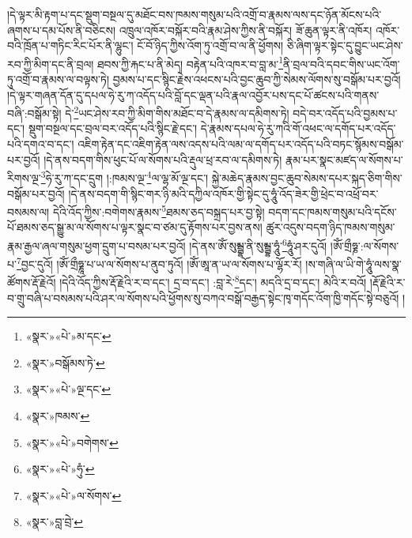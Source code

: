 །དེ་ལྟར་མི་རྟག་པ་དང་སྡུག་བསྔལ་དུ་མཐོང་བས་ཁམས་གསུམ་པའི་འགྲོ་བ་རྣམས་ལས་དང་ཉོན་མོངས་པའི་ཞགས་པ་དམ་པོས་ནི་བཅིངས། འཁྲུལ་འཁོར་བསྐོར་བའི་རྣམ་ཤེས་ཀྱིས་ནི་བསྐོར། ཟོ་ཆུན་ལྟར་ནི་འཁོར། འཁོར་བའི་ཁྲོན་པ་གཏིང་རིང་པོར་ནི་ལྷུང་། ངོ་བོ་ཉིད་ཀྱིས་འོག་ཏུ་འགྲོ་བ་ལ་ནི་ཕྱོགས། ཅི་ཞིག་ལྟར་སྟེང་དུ་བྱུང་ཡང་ཤེས་རབ་ཀྱི་མིག་དང་ནི་བྲལ། ཐབས་ཀྱི་རྐང་པ་ནི་མེད། བརྟེན་པའི་འཁར་བ་བླ་མ་\footnote{«སྣར་»«པེ་»མ་དང་}ནི་བྲལ་བའི་དབང་གིས་ཡང་འོག་ཏུ་འགྲོ་བ་རྣམས་ལ་བལྟས་ཏེ། བྱམས་པ་དང་སྙིང་རྗེས་འཕངས་པའི་བྱང་ཆུབ་ཀྱི་སེམས་ལོགས་སུ་བསྒོམ་པར་བྱའོ། །དེ་ལྟར་གཞན་དོན་དུ་དཔལ་ཧེ་རུ་ཀ་འདོད་པའི་བློ་དང་ལྡན་པའི་རྣལ་འབྱོར་པས་དང་པོ་ཚངས་པའི་གནས་བཞི་:བསྒོམ་སྟེ། དེ་\footnote{«སྣར་»བསྒོམས་ཏེ་}ཡང་ཤེས་རབ་ཀྱི་མིག་གིས་མཐོང་བ་དེ་རྣམས་ལ་དམིགས་ཏེ། བདེ་བར་འདོད་པའི་བྱམས་པ་དང་། སྡུག་བསྔལ་དང་བྲལ་བར་འདོད་པའི་སྙིང་རྗེ་དང་། དེ་རྣམས་དཔལ་ཧེ་རུ་ཀའི་གོ་འཕང་ལ་དགོད་པར་འདོད་པའི་དགའ་བ་དང་། འཇིག་རྟེན་དང་འཇིག་རྟེན་ལས་འདས་པའི་ལམ་ལ་དགོད་པར་འདོད་པའི་བཏང་སྙོམས་བསྒོམ་པར་བྱའོ། །དེ་ནས་བདག་གིས་ཕུང་པོ་ལ་སོགས་པའི་རྡུལ་ཕྲ་རབ་ལ་དམིགས་ཏེ། རྣམ་པར་སྣང་མཛད་ལ་སོགས་པ་རིགས་ལྔ་\footnote{«སྣར་»«པེ་»ལྔ་དང་}ཧེ་རུ་ཀ་དང་དྲུག །:ཁམས་ལྔ་\footnote{«སྣར་»ཁམས་}ལ་ལྷ་མོ་ལྔ་དང་། སྐྱེ་མཆེད་རྣམས་བྱང་ཆུབ་སེམས་དཔར་སྐད་ཅིག་གིས་བསྒོམ་པར་བྱའོ། །དེ་ནས་བདག་གི་སྙིང་གར་ཉི་མའི་དཀྱིལ་འཁོར་གྱི་སྟེང་དུ་ཧཱུཾ་འོད་ཟེར་གྱི་ཕྲེང་བ་འཕྲོ་བར་བསམས་ལ། དེའི་འོད་ཀྱིས་:བགེགས་རྣམས་\footnote{«སྣར་»«པེ་»བགེགས་}ཐམས་ཅད་བསྐྲད་པར་བྱ་སྟེ། བདག་དང་ཁམས་གསུམ་པའི་དངོས་པོ་ཐམས་ཅད་སྒྱུ་མ་ལ་སོགས་པ་ལྟར་སྣང་བ་ཙམ་དུ་རྟོགས་པར་བྱས་ནས། ཚུར་འདུས་བདག་ཉིད་ཁམས་གསུམ་རྣམ་རྒྱལ་ཞལ་གསུམ་ཕྱག་དྲུག་པ་བསམ་པར་བྱའོ། །དེ་ནས་ཨོཾ་སུམྦྷ་ནི་སུམྦྷ་ཧཱུཾ་\footnote{«སྣར་»«པེ་»ཧུཾ་}ཧཱུཾ་ཤར་དུའོ། །ཨོཾ་གྲྀཧྞ་:ལ་སོགས་པ་\footnote{«སྣར་»«པེ་»ལ་སོགས་}བྱང་དུའོ། །ཨོཾ་གྲྀཧྞཱ་པ་ཡ་ལ་སོགས་པ་ནུབ་ཏུའོ། །ཨོཾ་ཨཱ་ན་ཡ་ལ་སོགས་པ་ལྷོར་རོ། །ས་གཞི་ལ་ཡི་གེ་ཧཱུཾ་ལས་སྣ་ཚོགས་རྡོ་རྗེའོ། །དེའི་འོད་ཀྱིས་རྡོ་རྗེའི་ར་བ་དང་། དྲ་བ་དང་། :བླ་རེ་\footnote{«སྣར་»བླ་བྲེ་}དང་། མདའི་དྲ་བ་དང་། མེའི་ར་བའོ། །རྡོ་རྗེའི་ར་བ་གྲུ་བཞི་པ་བསམས་པའི་ཤར་ལ་སོགས་པའི་ཕྱོགས་སུ་བཀའ་བསྒོ་བརྒྱད་སྟེང་ཁྭ་གདོང་འོག་ཁྱི་གདོང་སྟེ་བཅུའོ། །
